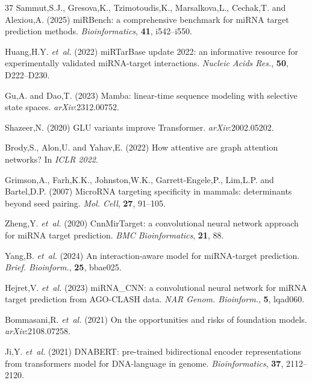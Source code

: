 \documentclass[unnumsec,webpdf,contemporary,large]{oup-authoring-template}
\begin{document}
\begin{thebibliography}{37}
Sammut,S.J., Gresova,K., Tzimotoudis,K., Marsalkova,L., Cechak,T. and Alexiou,A. (2025) miRBench: a comprehensive benchmark for miRNA target prediction methods. \textit{Bioinformatics}, \textbf{41}, i542--i550.

Huang,H.Y. \textit{et~al.} (2022) miRTarBase update 2022: an informative resource for experimentally validated miRNA-target interactions. \textit{Nucleic Acids Res.}, \textbf{50}, D222--D230.

Gu,A. and Dao,T. (2023) Mamba: linear-time sequence modeling with selective state spaces. \textit{arXiv}:2312.00752.

Shazeer,N. (2020) GLU variants improve Transformer. \textit{arXiv}:2002.05202.

Brody,S., Alon,U. and Yahav,E. (2022) How attentive are graph attention networks? In \textit{ICLR 2022}.

Grimson,A., Farh,K.K., Johnston,W.K., Garrett-Engele,P., Lim,L.P. and Bartel,D.P. (2007) MicroRNA targeting specificity in mammals: determinants beyond seed pairing. \textit{Mol. Cell}, \textbf{27}, 91--105.

Zheng,Y. \textit{et~al.} (2020) CnnMirTarget: a convolutional neural network approach for miRNA target prediction. \textit{BMC Bioinformatics}, \textbf{21}, 88.

Yang,B. \textit{et~al.} (2024) An interaction-aware model for miRNA-target prediction. \textit{Brief. Bioinform.}, \textbf{25}, bbae025.

Hejret,V. \textit{et~al.} (2023) miRNA\_CNN: a convolutional neural network for miRNA target prediction from AGO-CLASH data. \textit{NAR Genom. Bioinform.}, \textbf{5}, lqad060.

Bommasani,R. \textit{et~al.} (2021) On the opportunities and risks of foundation models. \textit{arXiv}:2108.07258.

Ji,Y. \textit{et~al.} (2021) DNABERT: pre-trained bidirectional encoder representations from transformers model for DNA-language in genome. \textit{Bioinformatics}, \textbf{37}, 2112--2120.


\end{thebibliography}
\end{document}
